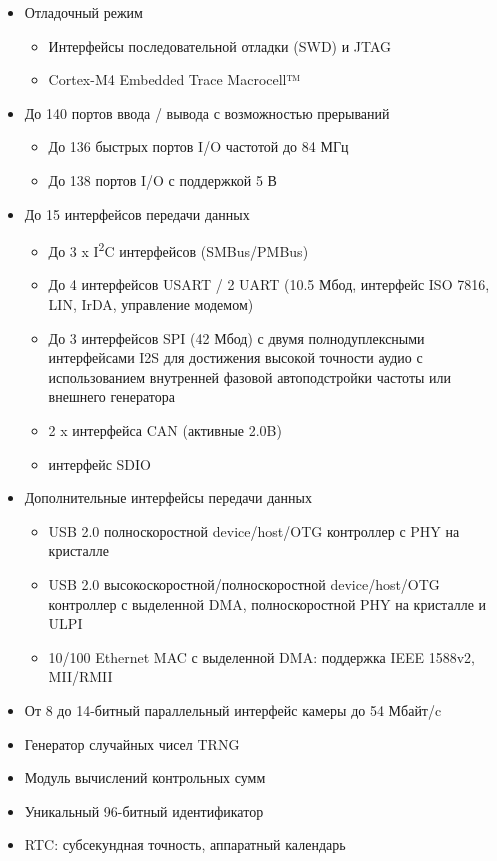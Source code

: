 \documentclass[document.tex]{subfiles}
\begin{document}
\begin{itemize}
	\item Отладочный режим
	\begin{itemize}
		\item Интерфейсы последовательной отладки (SWD) и JTAG
		\item Cortex-M4 Embedded Trace Macrocell™
	\end{itemize}
	\item До 140 портов ввода / вывода с возможностью прерываний
	\begin{itemize}
		\item До 136 быстрых портов I/O частотой до 84 МГц
		\item До 138 портов I/O с поддержкой 5 В
	\end{itemize}
	\item До 15 интерфейсов передачи данных
	\begin{itemize}
		\item До 3 x I\textsuperscript{2}C интерфейсов (SMBus/PMBus)
		\item До 4 интерфейсов USART / 2 UART (10.5 Мбод, интерфейс ISO 7816, LIN, IrDA, управление модемом)
		\item До 3 интерфейсов SPI (42 Мбод) с двумя полнодуплексными интерфейсами I2S для достижения высокой точности аудио с использованием внутренней фазовой автоподстройки частоты
		или внешнего генератора
		\item 2 x интерфейса CAN (активные 2.0B)
		\item интерфейс SDIO
	\end{itemize}
	\item Дополнительные интерфейсы передачи данных
	\begin{itemize}
		\item USB 2.0 полноскоростной device/host/OTG
контроллер с PHY на кристалле
		\item USB 2.0 высокоскоростной/полноскоростной
device/host/OTG контроллер с выде\-ленной DMA, полноскоростной PHY на кристалле и ULPI
		\item 10/100 Ethernet MAC с выделенной DMA:
поддержка IEEE 1588v2, MII/RMII
	\end{itemize}
	\item От 8 до 14-битный параллельный интерфейс камеры до 54 Мбайт/c
	\item Генератор случайных чисел TRNG
	\item Модуль вычислений контрольных сумм
	\item Уникальный 96-битный идентификатор
	\item RTC: субсекундная точность, аппаратный календарь\cite{mcu}
\end{itemize}
\end{document}
